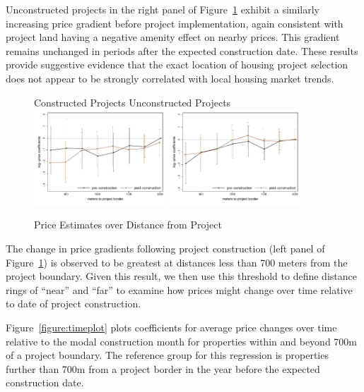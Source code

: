 \documentclass[12pt]{article}
\begin{document}
Unconstructed projects in the right panel of Figure~\ref{figure:distplot} exhibit a similarly increasing price gradient before project implementation, again consistent with project land having a negative amenity effect on nearby prices. This gradient remains unchanged in periods after the expected construction date.  These results provide suggestive evidence that the exact location of housing project selection does not appear to be strongly correlated with local housing market trends.
\begin{figure}
\caption{Price Estimates over Distance from Project}\label{figure:distplot}
\centering
Constructed Projects \hspace{3.6cm} Unconstructed Projects
\includegraphics[width=0.44\textwidth,trim={.77cm 0cm .21cm 0cm}]{figures/distance_plot_rdp.pdf}
\includegraphics[width=0.44\textwidth,trim={.77cm 0cm .21cm 0cm},clip]{figures/distance_plot_placebo.pdf}\\
\end{figure}
The change in price gradients following project construction (left panel of Figure~\ref{figure:distplot}) is observed to be greatest at distances less than 700 meters from the project boundary.  Given this result, we then use this threshold to define distance rings of ``near'' and ``far'' to examine how prices might change over time relative to date of project construction.

Figure~\ref{figure:timeplot} plots coefficients for average price changes over time relative to the modal construction month for properties within and beyond 700m of a project boundary.  The reference group for this regression is properties further than 700m from a project border in the year before the expected construction date.  
\end{document}
